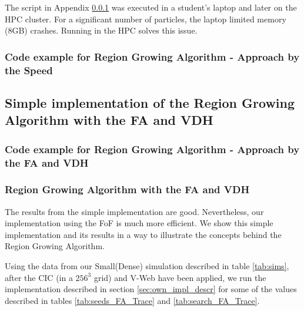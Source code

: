 \documentclass[12pt]{article}
\begin{document}
The script in Appendix \ref{App:App_speed_code} was executed in a student's
laptop and later on the HPC cluster. For a significant number of particles, the laptop limited memory (8GB) crashes. Running in the HPC solves this issue.


\subsubsection{Code example for Region Growing Algorithm - Approach by the Speed} \label{App:App_speed_code}
\tiny




\subsection{Simple implementation of the Region Growing Algorithm with the FA and VDH}

\subsubsection{Code example for Region Growing Algorithm - Approach by the FA and VDH}
\label{App:own_impl_code}
\tiny


\normalsize
\subsubsection{Region Growing Algorithm with the FA and VDH} \label{sec:results_own_impl}

\begin{par}
The results from the simple implementation are good. Nevertheless, our implementation using the FoF is much more efficient. We show this simple implementation and its results in a way to illustrate the concepts behind the Region Growing Algorithm.
\end{par}

\begin{par}
Using the data from our Small(Dense) simulation described in
 table \ref{tab:sims}, after the CIC (in a
  $256^3$ grid) and V-Web have been applied,
   we run the implementation described in section
    \ref{sec:own_impl_descr} for some of the
     values described in tables
      \ref{tab:seeds_FA_Trace} and
       \ref{tab:search_FA_Trace}. 
\end{par}
\end{document}
